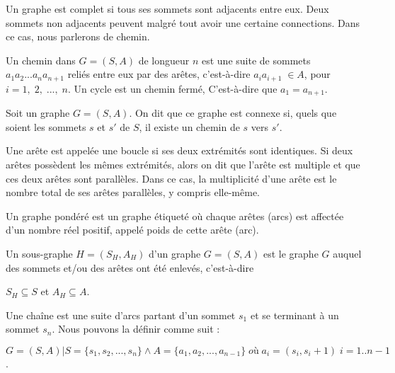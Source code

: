 \begin{definition}
Un graphe est complet si tous ses sommets sont adjacents entre eux. Deux sommets non adjacents peuvent malgré tout avoir une certaine connections. Dans ce cas, nous parlerons de chemin.
\end{definition}

\begin{definition}[Chemin]
Un chemin dans $G = (S, A)$ de longueur $n$ est une suite de sommets $a_{1}a_{2} . . . a_{n}a_{n+1}$ reliés entre eux par des arêtes, c'est-à-dire $a_{i}a_{i+1} \;\in A$, pour $i = 1,\; 2, \; . . .,\; n$. Un cycle est un chemin fermé, C'est-à-dire que $a_{1} = a_{n+1}$.
\end{definition}

\begin{definition}
Soit un graphe $G = (S, A)$. On dit que ce graphe est connexe si, quels que soient les sommets $s$ et $s'$ de $S$, il existe un chemin de $s$ vers $s'$. 
\end{definition}

\begin{definition}
Une arête est appelée une boucle si ses deux extrémités sont identiques. Si deux arêtes possèdent les mêmes extrémités, alors on dit que l'arête est multiple et que ces deux arêtes sont parallèles. Dans ce cas, la multiplicité d'une arête est le nombre total de ses arêtes parallèles, y compris elle-même.
\end{definition}

\begin{definition}
Un graphe pondéré est un graphe étiqueté où chaque arêtes (arcs) est affectée d'un nombre réel positif, appelé poids de cette arête (arc).
\end{definition}

\begin{definition}
Un sous-graphe $H = (S_H, A_H)$ d'un graphe $G = (S, A)$ est le graphe $G$ auquel des sommets et/ou des arêtes ont été enlevés, c'est-à-dire   
\begin{center}
$S_H \subseteq S$ et $A_H \subseteq A$.
\end{center}
\end{definition}

\begin{definition}[Chaîne]
	Une chaîne est une suite d'arcs partant d'un sommet $s_1$ et se terminant à un sommet $s_{n}$. Nous pouvons la définir comme suit :\begin{flushleft}
	$ G = (S, A) | S = \{s_1, s_2, ..., s_n\} \wedge A=\{a_1, a_2, ..., a_{n-1}\}\; où\; a_i = (s_i, s_i+1)\; i=1..n-1 $.
	\end{flushleft}
\end{definition}

